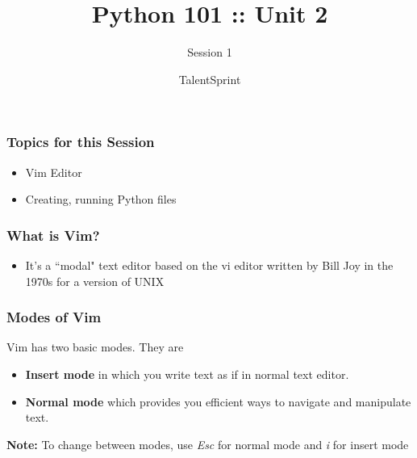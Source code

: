 \documentclass[14pt]{beamer}
\title{Python 101 :: Unit 2}
\subtitle{Session 1}
\date{}
\author[TS]{TalentSprint}
\begin{document}
    \begin{frame}
        \titlepage
    \end{frame}

    \begin{frame}
        \frametitle{Topics for this Session}
        \begin{itemize}
            \item Vim Editor
            \item Creating, running Python files
        \end{itemize}
    \end{frame}

    \begin{frame}
        \frametitle{What is Vim?}
        \begin{itemize}
            \item It's a ``modal" text editor based on the vi editor written by Bill Joy in the 1970s for a version of UNIX 
        \end{itemize}
    \end{frame}

    \begin{frame}
        \frametitle{Modes of Vim}
        Vim has two basic modes. They are 
        \begin{itemize}
            \item \textbf{Insert mode} in which you write text as if in normal text editor.
            \item \textbf{Normal mode} which provides you efficient ways to navigate and manipulate text.
        \end{itemize}
        \textbf{Note:} To change between modes, use \emph{Esc} for normal mode and \emph{i} for insert mode
    \end{frame}
\end{document}
